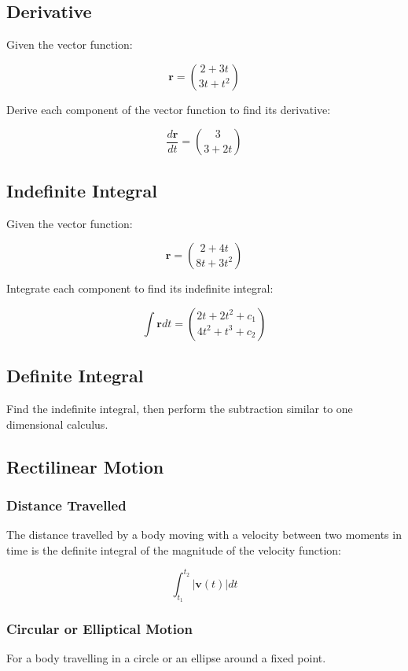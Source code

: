 \documentclass[a4paper,11pt]{article}
\newcommand{\bb}{\boldsymbol}
\begin{document}
\subsection{Derivative}

Given the vector function:

$$
\bb{r} = \binom{2 + 3t}{3t + t^2}
$$

Derive each component of the vector function to find its derivative:

$$
\frac{d\bb{r}}{dt} = \binom{3}{3 + 2t}
$$


\subsection{Indefinite Integral}

Given the vector function:

$$
\bb{r} = \binom{2 + 4t}{8t + 3t^2}
$$

Integrate each component to find its indefinite integral:

$$
\int \bb{r} dt = \binom{2t + 2t^2 + c_1}{4t^2 + t^3 + c_2}
$$


\subsection{Definite Integral}

Find the indefinite integral, then perform the subtraction similar to one
dimensional calculus.


\subsection{Rectilinear Motion}

\subsubsection{Distance Travelled}

The distance travelled by a body moving with a velocity between two moments in
time is the definite integral of the magnitude of the velocity function:

$$
\int_{t_1}^{t_2} \lvert \bb{v}(t) \rvert dt
$$


\subsubsection{Circular or Elliptical Motion}

For a body travelling in a circle or an ellipse around a fixed point.
\end{document}
